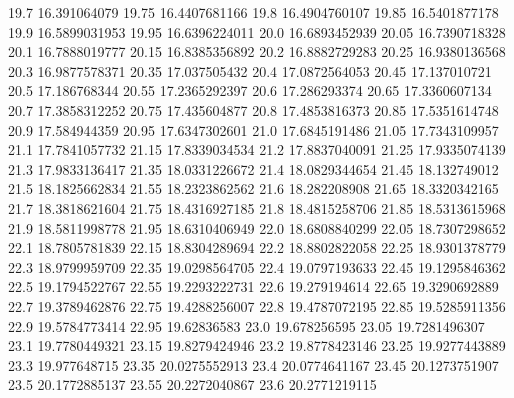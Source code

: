           19.7     16.391064079
          19.75    16.4407681166
           19.8    16.4904760107
          19.85    16.5401877178
           19.9    16.5899031953
          19.95    16.6396224011
           20.0    16.6893452939
          20.05    16.7390718328
           20.1    16.7888019777
          20.15    16.8385356892
           20.2    16.8882729283
          20.25    16.9380136568
           20.3    16.9877578371
          20.35     17.037505432
           20.4    17.0872564053
          20.45     17.137010721
           20.5     17.186768344
          20.55    17.2365292397
           20.6     17.286293374
          20.65    17.3360607134
           20.7    17.3858312252
          20.75     17.435604877
           20.8    17.4853816373
          20.85    17.5351614748
           20.9     17.584944359
          20.95    17.6347302601
           21.0    17.6845191486
          21.05    17.7343109957
           21.1    17.7841057732
          21.15    17.8339034534
           21.2    17.8837040091
          21.25    17.9335074139
           21.3    17.9833136417
          21.35    18.0331226672
           21.4    18.0829344654
          21.45     18.132749012
           21.5    18.1825662834
          21.55    18.2323862562
           21.6     18.282208908
          21.65    18.3320342165
           21.7    18.3818621604
          21.75    18.4316927185
           21.8    18.4815258706
          21.85    18.5313615968
           21.9    18.5811998778
          21.95    18.6310406949
           22.0    18.6808840299
          22.05    18.7307298652
           22.1    18.7805781839
          22.15    18.8304289694
           22.2    18.8802822058
          22.25    18.9301378779
           22.3    18.9799959709
          22.35    19.0298564705
           22.4    19.0797193633
          22.45    19.1295846362
           22.5    19.1794522767
          22.55    19.2293222731
           22.6     19.279194614
          22.65    19.3290692889
           22.7    19.3789462876
          22.75    19.4288256007
           22.8    19.4787072195
          22.85    19.5285911356
           22.9    19.5784773414
          22.95      19.62836583
           23.0     19.678256595
          23.05    19.7281496307
           23.1    19.7780449321
          23.15    19.8279424946
           23.2    19.8778423146
          23.25    19.9277443889
           23.3     19.977648715
          23.35    20.0275552913
           23.4    20.0774641167
          23.45    20.1273751907
           23.5    20.1772885137
          23.55    20.2272040867
           23.6    20.2771219115
